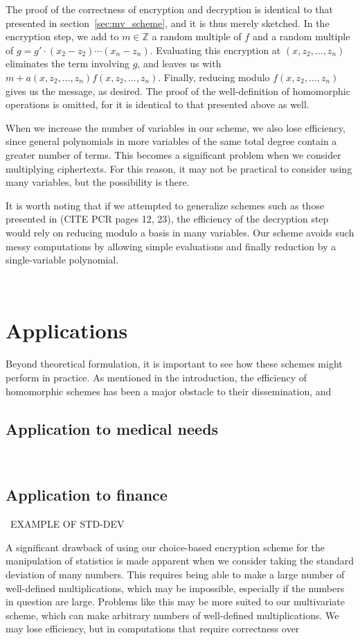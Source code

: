 \documentclass[11pt]{report}
\newcommand{\Z}{\mathbb{Z}}
\begin{document}
The proof of the correctness of encryption and decryption is identical to that presented in section~\ref{sec:mv_scheme}, and it is thus merely sketched. In the encryption step, we add to $m\in \Z$ a random multiple of $f$ and a random multiple of $g=g'\cdot(x_2-z_2)\cdots(x_n-z_n)$. Evaluating this encryption at $(x,z_2,\dots,z_n)$ eliminates the term involving $g$, and leaves us with $m+a(x,z_2,\dots,z_n)f(x,z_2,\dots,z_n)$. Finally, reducing modulo $f(x,z_2,\dots,z_n)$ gives us the message, as desired. The proof of the well-definition of homomorphic operations is omitted, for it is identical to that presented above as well.

When we increase the number of variables in our scheme, we also lose efficiency, since general polynomials in more variables of the same total degree contain a greater number of terms. This becomes a significant problem when we consider multiplying ciphertexts. For this reason, it may not be practical to consider using many variables, but the possibility is there.

It is worth noting that if we attempted to generalize schemes such as those presented in (CITE PCR pages 12, 23), the efficiency of the decryption step would rely on reducing modulo a basis in many variables. Our scheme avoids such messy computations by allowing simple evaluations and finally reduction by a single-variable polynomial.

\


\chapter{Applications}

Beyond theoretical formulation, it is important to see how these schemes might perform in practice. As mentioned in the introduction, the efficiency of homomorphic schemes has been a major obstacle to their dissemination, and 

\section{Application to medical needs}

\

\section{Application to finance}

\ EXAMPLE OF STD-DEV

A significant drawback of using our choice-based encryption scheme for the manipulation of statistics is made apparent when we consider taking the standard deviation of many numbers. This requires being able to make a large number of well-defined multiplications, which may be impossible, especially if the numbers in question are large. Problems like this may be more suited to our multivariate scheme, which can make arbitrary numbers of well-defined multiplications. We may lose efficiency, but in computations that require correctness over
\end{document}
